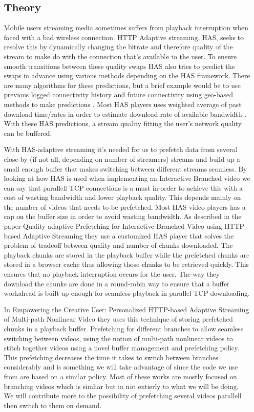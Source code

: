 \documentclass[9pt,a4paper]{acmproc}
\begin{document}
\subsection{Theory}
Mobile users streaming media sometimes suffers from playback interruption when faced with a bad wireless connection. HTTP Adaptive streaming, HAS, seeks to resolve this by dynamically changing the bitrate and therefore quality of the stream to make do with the connection that’s available to the user. To ensure smooth transitions between these quality swaps HAS also tries to predict the swaps in advance using various methods depending on the HAS framework. There are many algorithms for these predictions, but a brief example would be to use previous logged connectivity history and future connectivity using geo-based methods to make predictions \cite{gtube}. Most HAS players uses weighted average of past download time/rates in order to estimate download rate of available bandwidth \cite[s.~317-326]{qualbranch}. With these HAS predictions, a stream quality fitting the user’s network quality can be buffered.\cite{gtube}

With HAS-adaptive streaming it’s needed for us to prefetch data from several close-by (if not all, depending on number of streamers) streams and build up a small enough buffer that makes switching between different streams seamless. By looking at how HAS is used when implementing an Interactive Branched video we can say that parallell TCP connections is a must in-order to achieve this with a cost of wasting bandwidth and lower playback quality. This depends mainly on the number of videos that needs to be prefetched. Most HAS video players has a cap on the buffer size in order to avoid wasting bandwidth. As described in the paper Quality-adaptive Prefetching for Interactive Branched Video using HTTP-based Adaptive Streaming they use a customized HAS player that solves the problem of tradeoff between quality and number of chunks downloaded. The playback chunks are stored in the playback buffer while the prefetched chunks are stored in a browser cache thus allowing those chunks to be retrieved quickly. This ensures that no playback interruption occurs for the user. The way they download the chunks are done in a round-robin way to ensure that a buffer workahead is built up enough for seamless playback in parallel TCP downloading. \cite[s.~317-326]{qualbranch} 

In Empowering the Creative User: Personalized HTTP-based Adaptive Streaming of Multi-path Nonlinear Video they uses this technique of storing prefetched chunks in a playback buffer. Prefetching for different branches to allow seamless switching between videos, using the notion of multi-path nonlinear videos to stitch together videos using a novel buffer management and prefetching policy. This prefetching decreases the time it takes to switch between branches considerably and is something we will take advantage of since the code we use from \cite[s.~317-326]{qualbranch} are based on a similar policy. Most of these works are mostly focused on branching videos which is simliar but in not entierly to what we will be doing. We will contribute more to the possibility of prefetching several videos parallell then switch to them on demand. \cite[s.~317-326]{qualbranch} \cite{osmf}
\end{document}
